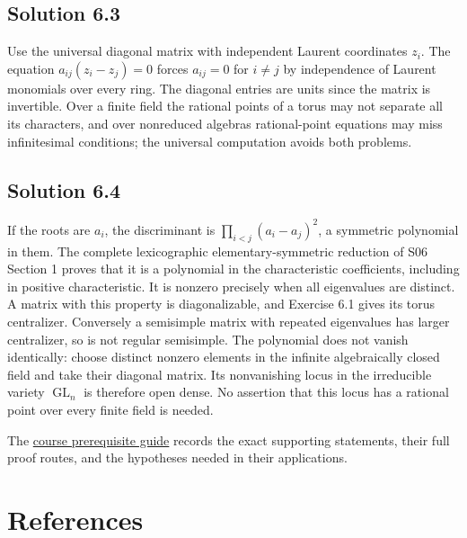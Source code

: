 \documentclass[11pt,a4paper,openany]{report}
\begin{document}
\subsection{Solution 6.3}\label{AG-RG-02-solution-6.3}

Use the universal diagonal matrix with independent Laurent coordinates \(z_i\). The equation \(a_{ij}(z_i-z_j)=0\) forces \(a_{ij}=0\) for \(i\ne j\) by independence of Laurent monomials over every ring. The diagonal entries are units since the matrix is invertible. Over a finite field the rational points of a torus may not separate all its characters, and over nonreduced algebras rational-point equations may miss infinitesimal conditions; the universal computation avoids both problems.

\subsection{Solution 6.4}\label{AG-RG-02-solution-6.4}

If the roots are \(a_i\), the discriminant is \(\prod_{i<j}(a_i-a_j)^2\), a symmetric polynomial in them. The complete lexicographic elementary-symmetric reduction of S06 Section 1 proves that it is a polynomial in the characteristic coefficients, including in positive characteristic. It is nonzero precisely when all eigenvalues are distinct. A matrix with this property is diagonalizable, and Exercise 6.1 gives its torus centralizer. Conversely a semisimple matrix with repeated eigenvalues has larger centralizer, so is not regular semisimple. The polynomial does not vanish identically: choose distinct nonzero elements in the infinite algebraically closed field and take their diagonal matrix. Its nonvanishing locus in the irreducible variety \(\operatorname{GL}_n\) is therefore open dense. No assertion that this locus has a rational point over every finite field is needed.

The \href{prerequisites.html}{course prerequisite guide} records the exact supporting statements, their full proof routes, and the hypotheses needed in their applications.

\section{References}\label{AG-RG-02-references}
\end{document}
